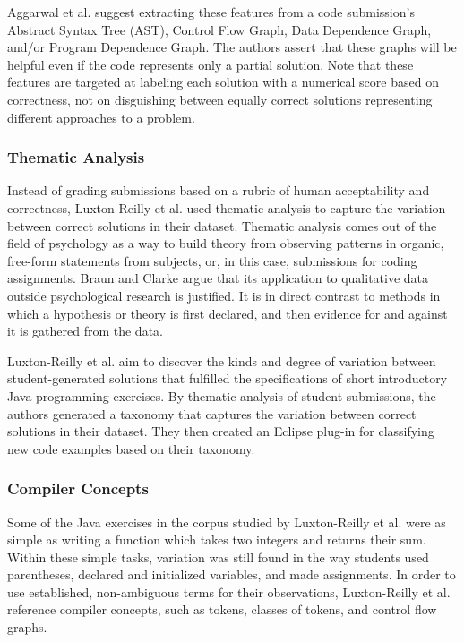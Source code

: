 Aggarwal et al. suggest extracting these features from a code submission's Abstract Syntax Tree (AST), Control Flow Graph, Data Dependence Graph, and/or Program Dependence Graph. The authors assert that these graphs will be helpful even if the code represents only a partial solution. Note that these features are targeted at labeling each solution with a numerical score based on correctness, not on disguishing between equally correct solutions representing different approaches to a problem.


\subsubsection{Thematic Analysis}

Instead of grading submissions based on a rubric of human acceptability and correctness, Luxton-Reilly et al. \cite{Luxton13} used thematic analysis to capture the variation between correct solutions in their dataset. Thematic analysis comes out of the field of psychology as a way to build theory from observing patterns in organic, free-form statements from subjects, or, in this case, submissions for coding assignments. Braun and Clarke \cite{thematic06} argue that its application to qualitative data outside psychological research is justified. It is in direct contrast to methods in which a hypothesis or theory is first declared, and then evidence for and against it is gathered from the data. 

Luxton-Reilly et al. \cite{Luxton13} aim to discover the kinds and degree of variation between student-generated solutions that fulfilled the specifications of short introductory Java programming exercises . By thematic analysis of student submissions, the authors generated a taxonomy that captures the variation between correct solutions in their dataset. They then created an Eclipse plug-in for classifying new code examples based on their taxonomy. 

\subsubsection{Compiler Concepts}

Some of the Java exercises in the corpus studied by Luxton-Reilly et al. \cite{Luxton13} were as simple as writing a function which takes two integers and returns their sum. Within these simple tasks, variation was still found in the way students used parentheses, declared and initialized variables, and made assignments. In order to use established, non-ambiguous terms for their observations, Luxton-Reilly et al. reference compiler concepts, such as tokens, classes of tokens, and control flow graphs. 

